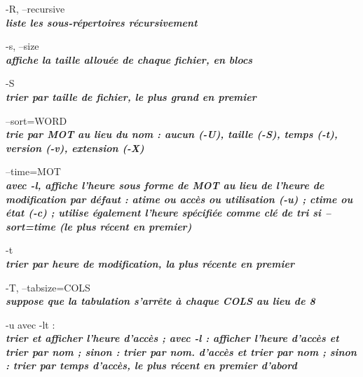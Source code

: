 \documentclass{article}
\begin{document}
      \par -R, --recursive\\
              \textit{\textbf{liste les sous-répertoires récursivement}}\\

      \par -s, --size\\
             \textit{\textbf{  affiche la taille allouée de chaque fichier, en blocs}}\\

       \par-S\\          \textit{\textbf{ trier par taille de fichier, le plus grand en premier}}\\

       \par--sort=WORD\\ 
              \textit{\textbf{trie par MOT au lieu du nom : aucun (-U), taille (-S), temps (-t),
              version (-v), extension (-X)}}\\

       \par --time=MOT\\ 
              \textit{\textbf{avec -l, affiche l'heure sous forme de MOT au lieu de l'heure de modification par défaut :
              atime ou accès ou utilisation (-u) ; ctime ou état (-c) ; utilise également
              l'heure spécifiée comme clé de tri si --sort=time (le plus récent en premier)}}\\

   

        \par -t \\      \textit{\textbf{trier par heure de modification, la plus récente en premier}}\\

      \par -T, --tabsize=COLS\\  
              \textit{\textbf{suppose que la tabulation s'arrête à chaque COLS au lieu de 8}}\\

         \par-u avec -lt :\\    \textit{\textbf{trier et afficher l'heure d'accès ; avec -l : afficher l'heure d'accès et trier par nom ; sinon : trier par nom.
              d'accès et trier par nom ; sinon : trier par temps d'accès, le plus récent en premier
              d'abord}}\\
\end{document}

